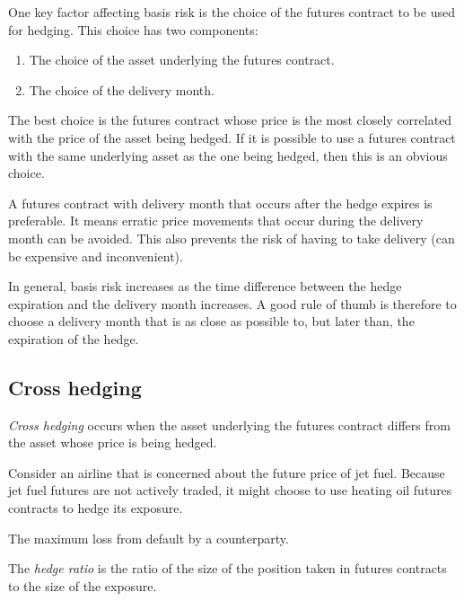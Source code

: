 One key factor affecting basis risk is the choice of the futures contract to be used for hedging. This choice has two components:

\begin{enumerate}
    \item The choice of the asset underlying the futures contract.
    \item The choice of the delivery month.
\end{enumerate}

The best choice is the futures contract whose price is the most closely correlated with the price of the asset being hedged. If it is possible to use a futures contract with the same underlying asset as the one being hedged, then this is an obvious choice.

A futures contract with delivery month that occurs after the hedge expires is preferable. It means erratic price movements that occur during the delivery month can be avoided. This also prevents the risk of having to take delivery (can be expensive and inconvenient).

In general, basis risk increases as the time difference between the hedge expiration and the delivery month increases. A good rule of thumb is therefore to choose a delivery month that is as close as possible to, but later than, the expiration of the
hedge.

\subsection{Cross hedging}
\bigskip

\begin{definition}
    \emph{Cross hedging} occurs when the asset underlying the futures contract differs from the asset whose price is being hedged.
\end{definition}

\begin{eg}
    Consider an airline that is concerned about the future price
    of jet fuel. Because jet fuel futures are not actively traded, it might choose to use heating oil futures contracts to hedge its exposure.
\end{eg}

\begin{definition}[Exposure]
    The maximum loss from default by a counterparty.
\end{definition}

\begin{definition}
    The \emph{hedge ratio} is the ratio of the size of the position taken in futures contracts to the size of the exposure.
\end{definition}

